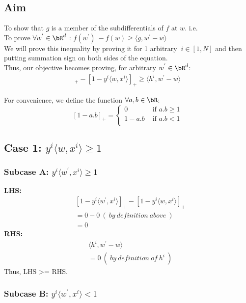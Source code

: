 \documentclass[a4paper,11pt]{article}
\begin{document}
\begin{mlsolution}
\subsection*{Aim}
To show that $g$ is a member of the subdifferentials of $f$ at $w$. i.e. \\ 
To prove $\forall w^{'} \in \bR^d$ : $f(w^{'}) \ - f(w) \geq \langle g, w^{'} - w \rangle$ \\
We will prove this inequality by proving it for 1 arbitrary $ \ i \in [1,N]$ and then putting summation sign on both sides of the equation.\\
Thus, our objective becomes proving, for arbitrary $w^{'} \in \bR^d$:
\begin{align}
    [1-y^{i}\langle w^{'},x^i \rangle ]_{+} - [1-y^{i}\langle w,x^i \rangle ]_{+} \geq \langle h^i, w^{'} - w \rangle
\end{align}

For convenience, we define the function $\forall a,b \in \bR$:
\[
 [1-a.b]_{+} =
\left\{
\!
\begin{aligned}
0 & \text{ if } a.b \geq 1\\
1-a.b & \text{ if } a.b < 1\\
\end{aligned}
\right.
\]

\subsection*{Case 1: $y^{i}\langle w,x^i \rangle \geq 1$}
\subsubsection*{Subcase A: $y^{i}\langle w^{'},x^i \rangle \geq 1$}

\textbf{LHS:} 
\begin{align}
    &[1-y^{i}\langle w^{'},x^i \rangle ]_{+} - [1-y^{i}\langle w,x^i \rangle ]_{+} \\
    &= 0 - 0 \ ( \ by \ definition \ above \ ) \\
    &=0
\end{align}
\textbf{RHS:}
\begin{align}
     &\langle h^i, w^{'} - w \rangle\\
    &= 0  \ ( \ by \ definition \ of \ h^i \ )
\end{align}
Thus, LHS \textgreater= RHS.

\subsubsection*{Subcase B: $y^{i}\langle w^{'},x^i \rangle < 1$}


\end{mlsolution}
\end{document}

